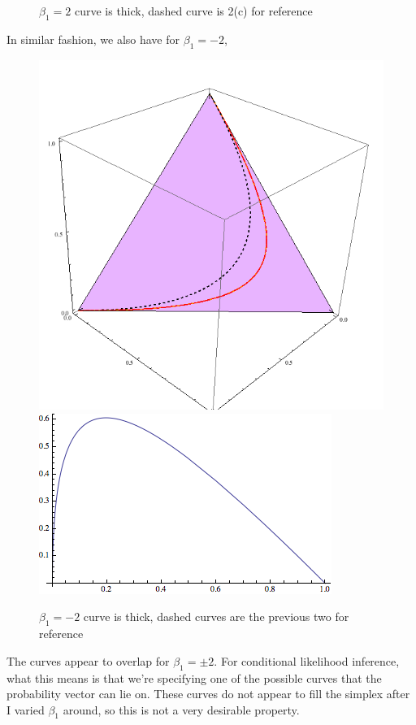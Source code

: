 \documentclass[11pt]{article}
\begin{document}
\begin{enumerate}
\begin{enumerate}
\begin{figure}[H]
				\caption{$\beta_1=2$ curve is thick, dashed curve is 2(c) for reference}
			\end{figure}	
			In similar fashion, we also have for $\beta_1=-2$,
			\begin{figure}[H]
				\includegraphics[scale=0.5]{plot3.png}
				\includegraphics[scale=0.5]{projplot2d2}
				\caption{$\beta_1=-2$ curve is thick, dashed curves are the previous two for reference}
			\end{figure}	
			The curves appear to overlap for $\beta_1=\pm2$. For conditional likelihood inference, what this means is that we're specifying one of the possible curves that the probability vector can lie on. These curves do not appear to fill the simplex after I varied $\beta_1$ around, so this is not a very desirable property. 

\end{enumerate}
\end{enumerate}
\end{document}
